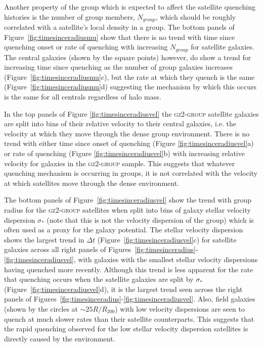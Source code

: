 Another property of the group which is expected to affect the satellite quenching histories is the number of group members, $N_{group}$, which should be roughly correlated with a satellite's local density in a  group. The bottom panels of Figure~\ref{fig:timesinceradiusmu} show that there is no trend with time since quenching onset or rate of quenching with increasing $N_{group}$ for satellite galaxies. The central galaxies (shown by the square points) however, do show a trend for increasing time since quenching as the number of group galaxies increases (Figure~\ref{fig:timesinceradiusmu}c), but the rate at which they quench is the same (Figure~\ref{fig:timesinceradiusmu}d) suggesting the mechanism by which this occurs is the same for all centrals regardless of halo mass. 

In the top panels of Figure \ref{fig:timesinceradiusvel} the \textsc{gz2-group} satellite galaxies are split into bins of their relative velocity to their central galaxies, i.e. the velocity at which they move through the dense group environment. There is no trend with either time since onset of quenching (Figure \ref{fig:timesinceradiusvel}a) or rate of quenching (Figure \ref{fig:timesinceradiusvel}b) with increasing relative velocity for galaxies in the \textsc{gz2-group} sample. This suggests that whatever quenching mechanism is occurring in groups, it is not correlated with the velocity at which satellites move through the dense environment.

The bottom panels of Figure~\ref{fig:timesinceradiusvel} show the trend with group radius for the \textsc{gz2-group} satellites when split into bins of galaxy stellar velocity dispersion $\sigma_*$ (note that this is not the velocity dispersion of the group) which is often used as a proxy for the galaxy potential. The stellar velocity dispersion shows the largest trend in $\Delta t$ (Figure~\ref{fig:timesinceradiusvel}c) for satellite galaxies across all right panels of Figures~\ref{fig:timesinceradius}-\ref{fig:timesinceradiusvel}, with galaxies with the smallest stellar velocity dispersions having quenched more recently. Although this trend is less apparent for the rate that quenching occurs when the satellite galaxies are split by $\sigma_*$ (Figure~\ref{fig:timesinceradiusvel}d), it is the largest trend seen across the right panels of Figures~\ref{fig:timesinceradius}-\ref{fig:timesinceradiusvel}. Also, field galaxies (shown by the circles at $\sim 25 R/R_{200}$) with low velocity dispersions are seen to quench at much slower rates than their satellite counterparts. This suggests that the rapid quenching observed for the low stellar velocity dispersion satellites is directly caused by the environment. 

